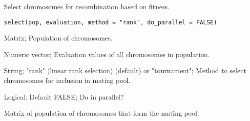 %
\begin{Description}\relax
Select chromosomes for recombination based on fitness.
\end{Description}
%
\begin{Usage}
\begin{verbatim}
select(pop, evaluation, method = "rank", do_parallel = FALSE)
\end{verbatim}
\end{Usage}
%
\begin{Arguments}
\begin{ldescription}
\item[\code{pop}] Matrix; Population of chromosomes.

\item[\code{evaluation}] Numeric vector; Evaluation values of all chromosomes in population.

\item[\code{method}] String; "rank" (linear rank selection) (default) or
"tournament"; Method to select chromosomes for inclusion in mating pool.

\item[\code{do\_parallel}] Logical; Default FALSE; Do in parallel?
\end{ldescription}
\end{Arguments}
%
\begin{Value}
Matrix of population of chromosomes that form the mating pool.
\end{Value}
